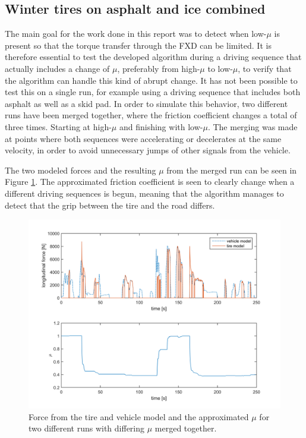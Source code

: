 \subsection{Winter tires on asphalt and ice combined}
The main goal for the work done in this report was to detect when low-$ \mu $ is present so that the torque transfer through the FXD can be limited. It is therefore essential to test the developed algorithm during a driving sequence that actually includes a change of $ \mu $, preferably from high-$ \mu $ to low-$ \mu $, to verify that the algorithm can handle this kind of abrupt change. It has not been possible to test this on a single run, for example using a driving sequence that includes both asphalt as well as a skid pad. In order to simulate this behavior, two different runs have been merged together, where the friction coefficient changes a total of three times. Starting at high-$ \mu $ and finishing with low-$ \mu $. The merging was made at points where both sequences were accelerating or decelerates at the same velocity, in order to avoid unnecessary jumps of other signals from the vehicle. 

The two modeled forces and the resulting $ \mu $ from the merged run can be seen in Figure \ref{force_mue_comb2}. The approximated friction coefficient is seen to clearly change when a different driving sequences is begun, meaning that the algorithm manages to detect that the grip between the tire and the road differs.
 
\begin{figure}[h]
	\centering
	\includegraphics[width=1.0\textwidth]{Pictures/force_mue_comb2}
	\caption {Force from the tire and vehicle model and the approximated $ \mu $ for two different runs with differing $ \mu $ merged together.}
	\label{force_mue_comb2}
\end{figure}

